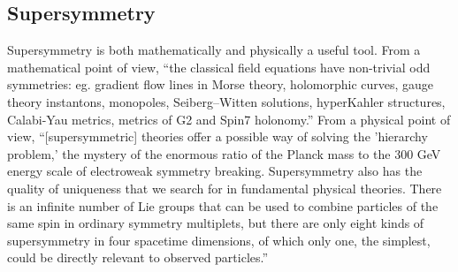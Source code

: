 \documentclass{report}
\theoremstyle{plain}
\theoremstyle{definition}
\theoremstyle{remark}
\begin{document}

\subsection{Supersymmetry}

Supersymmetry is both mathematically and physically a useful tool. From a
mathematical point of view, ``the classical field equations have
non-trivial odd symmetries: eg. gradient flow lines in Morse theory,
holomorphic curves, gauge theory instantons, monopoles, Seiberg--Witten
solutions, hyperKahler structures, Calabi-Yau metrics, metrics of G2 and
Spin7 holonomy.'' From a physical point of view, ``[supersymmetric]
theories offer a possible way of solving the 'hierarchy problem,' the
mystery of the enormous ratio of the Planck mass to the 300 GeV energy
scale of electroweak symmetry breaking. Supersymmetry also has the quality
of uniqueness that we search for in fundamental physical theories. There is
an infinite number of Lie groups that can be used to combine particles of
the same spin in ordinary symmetry multiplets, but there are only eight
kinds of supersymmetry in four spacetime dimensions, of which only one, the
simplest, could be directly relevant to observed particles.'' 
\end{document}
